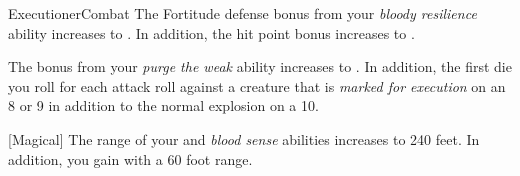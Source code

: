 \begin{feat}{Executioner}{Combat}
         The Fortitude defense bonus from your \textit{bloody resilience} ability increases to .
        In addition, the hit point bonus increases to .

         The bonus from your \textit{purge the weak} ability increases to .
        In addition, the first die you roll for each attack roll against a creature that is \textit{marked for execution}  on an 8 or 9 in addition to the normal explosion on a 10.

        [Magical] The range of your  and \textit{blood sense} abilities increases to 240 feet.
        In addition, you gain  with a 60 foot range.
    \end{feat}

